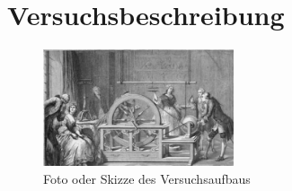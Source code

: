 \section{Versuchsbeschreibung}
\label{section:Versuchsbeschreibung}
%
\begin{figure}[!h]
		\centering
		\includegraphics[width=0.5\textwidth]{Abbildungen/Beispielbild_Versuchsaufbau.eps}
		\caption{Foto oder Skizze des Versuchsaufbaus}
		\label{fig:BspVers}
\end{figure}
%
